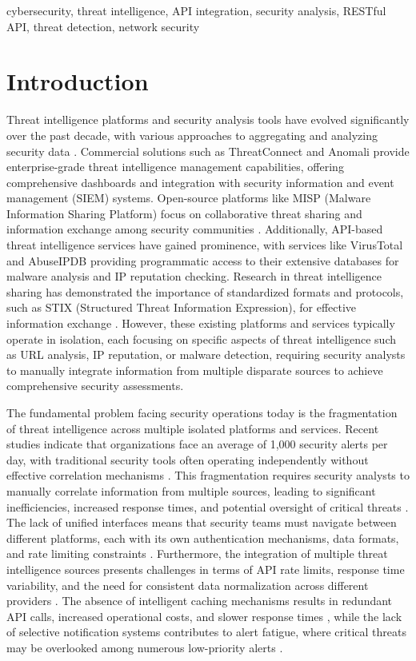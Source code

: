 \documentclass[conference]{IEEEtran}
\begin{document}
\begin{IEEEkeywords}
cybersecurity, threat intelligence, API integration, security analysis, RESTful API, threat detection, network security
\end{IEEEkeywords}

\section{Introduction}

Threat intelligence platforms and security analysis tools have evolved significantly over the past decade, with various approaches to aggregating and analyzing security data \cite{b10}. Commercial solutions such as ThreatConnect and Anomali provide enterprise-grade threat intelligence management capabilities, offering comprehensive dashboards and integration with security information and event management (SIEM) systems. Open-source platforms like MISP (Malware Information Sharing Platform) focus on collaborative threat sharing and information exchange among security communities \cite{b11}. Additionally, API-based threat intelligence services have gained prominence, with services like VirusTotal and AbuseIPDB providing programmatic access to their extensive databases for malware analysis and IP reputation checking. Research in threat intelligence sharing has demonstrated the importance of standardized formats and protocols, such as STIX (Structured Threat Information Expression), for effective information exchange \cite{b4}. However, these existing platforms and services typically operate in isolation, each focusing on specific aspects of threat intelligence such as URL analysis, IP reputation, or malware detection, requiring security analysts to manually integrate information from multiple disparate sources to achieve comprehensive security assessments.

The fundamental problem facing security operations today is the fragmentation of threat intelligence across multiple isolated platforms and services. Recent studies indicate that organizations face an average of 1,000 security alerts per day, with traditional security tools often operating independently without effective correlation mechanisms \cite{b2}. This fragmentation requires security analysts to manually correlate information from multiple sources, leading to significant inefficiencies, increased response times, and potential oversight of critical threats \cite{b3}. The lack of unified interfaces means that security teams must navigate between different platforms, each with its own authentication mechanisms, data formats, and rate limiting constraints \cite{b12}. Furthermore, the integration of multiple threat intelligence sources presents challenges in terms of API rate limits, response time variability, and the need for consistent data normalization across different providers \cite{b19}. The absence of intelligent caching mechanisms results in redundant API calls, increased operational costs, and slower response times \cite{b17,b18}, while the lack of selective notification systems contributes to alert fatigue, where critical threats may be overlooked among numerous low-priority alerts \cite{b2}.
\end{document}

